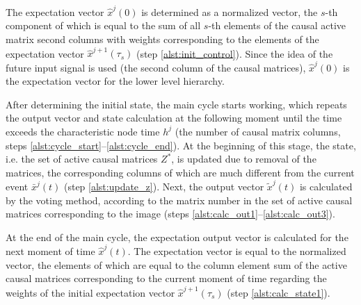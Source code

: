 \documentclass[12pt]{scrartcl}
\begin{document}
	\linespread{1}
	\begin{algorithm}[H]
		\label{alg:automato}
		\begin{algorithmic}[1]
			
		\end{algorithmic}
	\end{algorithm}
	\linespread{2}
	
	The expectation vector $\hat x^j(0)$ is determined as a normalized vector, the $s$-th component of which is equal to the sum of all $s$-th elements of the causal active matrix second columns with weights corresponding to the elements of the expectation vector $\hat x^{j+1}(\tau_s)$ (step \ref{alst:init_control}). Since the idea of the future input signal is used (the second column of the causal matrices), $\hat x^j(0)$ is the expectation vector for the lower level hierarchy.
	
	\linespread{1}
	\begin{algorithm}[H]
		\begin{algorithmic}[1]
			\algrestore{algst:store1}
			
		\end{algorithmic}
	\end{algorithm}
	\linespread{2}
		
	After determining the initial state, the main cycle starts working, which repeats the output vector and state calculation at the following moment until the time exceeds the characteristic node time $h^j$ (the number of causal matrix columns, steps \ref{alst:cycle_start}--\ref{alst:cycle_end}). At the beginning of this stage, the state, i.e. the set of active causal matrices $Z^*$, is updated due to removal of the matrices, the corresponding columns of which are much different from the current event $\bar x^j(t)$ (step \ref{alst:update_z}). Next, the output vector $\tilde x^j(t)$ is calculated by the voting method, according to the matrix number in the set of active causal matrices corresponding to the image (steps \ref{alst:calc_out1}--\ref{alst:calc_out3}).
	
	At the end of the main cycle, the expectation output vector is calculated for the next moment of time $\hat x^j(t)$. The expectation vector is equal to the normalized vector, the elements of which are equal to the column element sum of the active causal matrices corresponding to the current moment of time regarding the weights of the initial expectation vector $\hat x^{j+1}(\tau_s)$ (step \ref{alst:calc_state1}).
	
\end{document}
